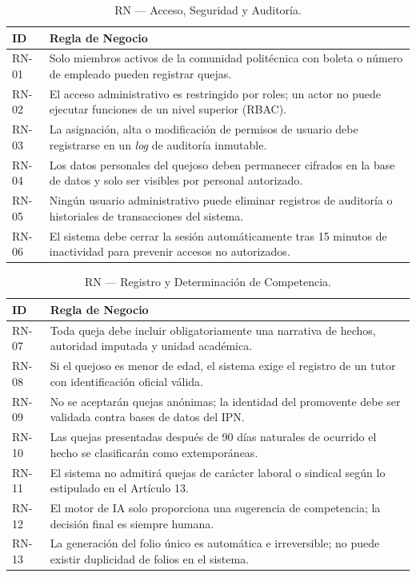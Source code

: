 \documentclass[12pt, oneside, letterpaper]{book}
\begin{document}
\begin{table}[H]
\centering
\caption{RN — Acceso, Seguridad y Auditoría.}
\begin{tabularx}{\textwidth}{@{} l X @{}}
\toprule
\rowcolor[HTML]{2D3E50}
\textbf{\color{white} ID} & \textbf{\color{white} Regla de Negocio} \\ \midrule
\rowcolor[HTML]{F2F4F7}
RN-01 & Solo miembros activos de la comunidad politécnica con boleta o número de empleado pueden registrar quejas. \\
RN-02 & El acceso administrativo es restringido por roles; un actor no puede ejecutar funciones de un nivel superior (RBAC). \\
\rowcolor[HTML]{F2F4F7}
RN-03 & La asignación, alta o modificación de permisos de usuario debe registrarse en un \textit{log} de auditoría inmutable. \\
RN-04 & Los datos personales del quejoso deben permanecer cifrados en la base de datos y solo ser visibles por personal autorizado. \\
\rowcolor[HTML]{F2F4F7}
RN-05 & Ningún usuario administrativo puede eliminar registros de auditoría o historiales de transacciones del sistema. \\
RN-06 & El sistema debe cerrar la sesión automáticamente tras 15 minutos de inactividad para prevenir accesos no autorizados. \\ \bottomrule
\end{tabularx}
\end{table}

\begin{table}[H]
\centering
\caption{RN — Registro y Determinación de Competencia.}
\begin{tabularx}{\textwidth}{@{} l X @{}}
\toprule
\rowcolor[HTML]{2D3E50}
\textbf{\color{white} ID} & \textbf{\color{white} Regla de Negocio} \\ \midrule
\rowcolor[HTML]{F2F4F7}
RN-07 & Toda queja debe incluir obligatoriamente una narrativa de hechos, autoridad imputada y unidad académica. \\
RN-08 & Si el quejoso es menor de edad, el sistema exige el registro de un tutor con identificación oficial válida. \\
\rowcolor[HTML]{F2F4F7}
RN-09 & No se aceptarán quejas anónimas; la identidad del promovente debe ser validada contra bases de datos del IPN. \\
RN-10 & Las quejas presentadas después de 90 días naturales de ocurrido el hecho se clasificarán como extemporáneas. \\
\rowcolor[HTML]{F2F4F7}
RN-11 & El sistema no admitirá quejas de carácter laboral o sindical según lo estipulado en el Artículo 13. \\
RN-12 & El motor de IA solo proporciona una sugerencia de competencia; la decisión final es siempre humana. \\
\rowcolor[HTML]{F2F4F7}
RN-13 & La generación del folio único es automática e irreversible; no puede existir duplicidad de folios en el sistema. \\ \bottomrule
\end{tabularx}
\end{table}
\end{document}
